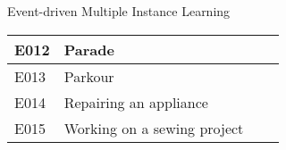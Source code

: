 \begin{frame}{Event-driven Multiple Instance Learning}
\begin{table}[h]
\begin{tabular}{@{}clll@{}}
		\multicolumn{1}{|l|}{E012} & \multicolumn{1}{l|}{Parade} & \multicolumn{1}{l|}{} & \multicolumn{1}{l|}{} \\ \midrule
		\multicolumn{1}{|l|}{E013} & \multicolumn{1}{l|}{Parkour} & \multicolumn{1}{l|}{} & \multicolumn{1}{l|}{} \\ \midrule
		\multicolumn{1}{|l|}{E014} & \multicolumn{1}{l|}{Repairing an appliance} & \multicolumn{1}{l|}{} & \multicolumn{1}{l|}{} \\ \midrule
		\multicolumn{1}{l}{E015} & Working on a sewing project &  &  \\ \bottomrule
	\end{tabular}
\end{table}
	
\end{frame}	
